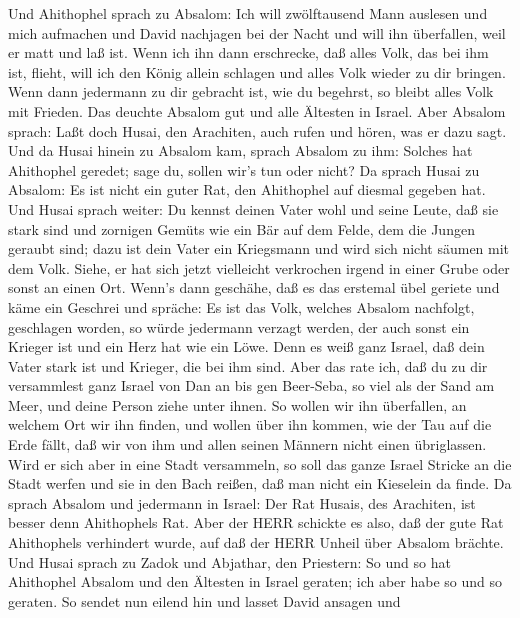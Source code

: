  Und Ahithophel sprach zu Absalom: Ich will zwölftausend
Mann auslesen und mich aufmachen und David nachjagen bei der Nacht
 und will ihn überfallen, weil er matt und laß ist. Wenn ich
ihn dann erschrecke, daß alles Volk, das bei ihm ist, flieht, will ich
den König allein schlagen  und alles Volk wieder zu dir
bringen. Wenn dann jedermann zu dir gebracht ist, wie du begehrst, so
bleibt alles Volk mit Frieden.  Das deuchte Absalom gut und
alle Ältesten in Israel.  Aber Absalom sprach: Laßt doch
Husai, den Arachiten, auch rufen und hören, was er dazu sagt.
 Und da Husai hinein zu Absalom kam, sprach Absalom zu ihm:
Solches hat Ahithophel geredet; sage du, sollen wir's tun oder nicht?
 Da sprach Husai zu Absalom: Es ist nicht ein guter Rat, den
Ahithophel auf diesmal gegeben hat.  Und Husai sprach
weiter: Du kennst deinen Vater wohl und seine Leute, daß sie stark sind
und zornigen Gemüts wie ein Bär auf dem Felde, dem die Jungen geraubt
sind; dazu ist dein Vater ein Kriegsmann und wird sich nicht säumen mit
dem Volk.  Siehe, er hat sich jetzt vielleicht verkrochen
irgend in einer Grube oder sonst an einen Ort. Wenn's dann geschähe, daß
es das erstemal übel geriete und käme ein Geschrei und spräche: Es ist
das Volk, welches Absalom nachfolgt, geschlagen worden,  so
würde jedermann verzagt werden, der auch sonst ein Krieger ist und ein
Herz hat wie ein Löwe. Denn es weiß ganz Israel, daß dein Vater stark
ist und Krieger, die bei ihm sind.  Aber das rate ich, daß
du zu dir versammlest ganz Israel von Dan an bis gen Beer-Seba, so viel
als der Sand am Meer, und deine Person ziehe unter ihnen. 
So wollen wir ihn überfallen, an welchem Ort wir ihn finden, und wollen
über ihn kommen, wie der Tau auf die Erde fällt, daß wir von ihm und
allen seinen Männern nicht einen übriglassen.  Wird er sich
aber in eine Stadt versammeln, so soll das ganze Israel Stricke an die
Stadt werfen und sie in den Bach reißen, daß man nicht ein Kieselein da
finde.  Da sprach Absalom und jedermann in Israel: Der Rat
Husais, des Arachiten, ist besser denn Ahithophels Rat. Aber der HERR
schickte es also, daß der gute Rat Ahithophels verhindert wurde, auf daß
der HERR Unheil über Absalom brächte.  Und Husai sprach zu
Zadok und Abjathar, den Priestern: So und so hat Ahithophel Absalom und
den Ältesten in Israel geraten; ich aber habe so und so geraten.
 So sendet nun eilend hin und lasset David ansagen und
